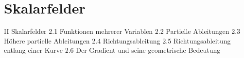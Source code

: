\chapter{Skalarfelder}

II Skalarfelder
2.1 Funktionen mehrerer Variablen
2.2 Partielle Ableitungen
2.3 Höhere partielle Ableitungen
2.4 Richtungsableitung
2.5 Richtungsableitung entlang einer Kurve
2.6 Der Gradient und seine geometrische Bedeutung

